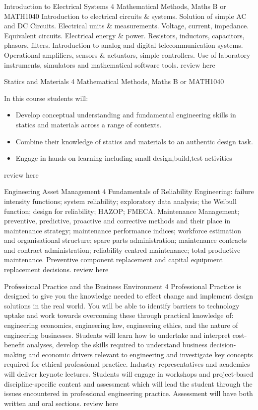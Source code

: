 	{Introduction to Electrical Systems}
	{4}
	{Mathematical Methods, Maths B or MATH1040}
	{}
	{}
	{Introduction to electrical circuits \& systems. Solution of simple AC and DC Circuits. Electrical units \& measurements. Voltage, current, impedance. Equivalent circuits. Electrical energy \& power. Resistors, inductors, capacitors, phasors, filters. Introduction to analog and digital telecommunication systems. Operational amplifiers, sensors \& actuators, simple controllers. Use of laboratory instruments, simulators and mathematical software tools.}
	{review here}

	{Statics and Materials}
	{4}
	{Mathematical Methods, Maths B or MATH1040}
	{}
	{}
	{In this course students will:
    \begin{itemize}
	\item Develop conceptual understanding and fundamental engineering skills in statics and materials across a range of contexts.
	\item Combine their knowledge of statics and materials to an authentic design task.
	\item Engage in hands on learning including small design,build,test activities
    \end{itemize}}
    {review here}

	{Engineering Asset Management}
	{4}
	{}
	{}
	{}
	{Fundamentals of Reliability Engineering: failure intensity functions; system reliability; exploratory data analysis; the Weibull function; design for reliability; HAZOP; FMECA. Maintenance Management; preventive, predictive, proactive and corrective methods and their place in maintenance strategy; maintenance performance indices; workforce estimation and organisational structure; spare parts administration; maintenance contracts and contract administration; reliability centred maintenance; total productive maintenance. Preventive component replacement and capital equipment replacement decisions.}
	{review here}

	{Professional Practice and the Business Environment}
	{4}
	{}
	{}
	{}
	{Professional Practice is designed to give you the knowledge needed to effect change and implement design solutions in the real world. You will be able to identify barriers to technology uptake and work towards overcoming these through practical knowledge of: engineering economics, engineering law, engineering ethics, and the nature of engineering businesses. Students will learn how to undertake and interpret cost-benefit analyses, develop the skills required to understand business decision-making and economic drivers relevant to engineering and investigate key concepts required for ethical professional practice. Industry representatives and academics will deliver keynote lectures. Students will engage in workshops and project-based discipline-specific content and assessment which will lead the student through the issues encountered in professional engineering practice. Assessment will have both written and oral sections.}
	{review here}

